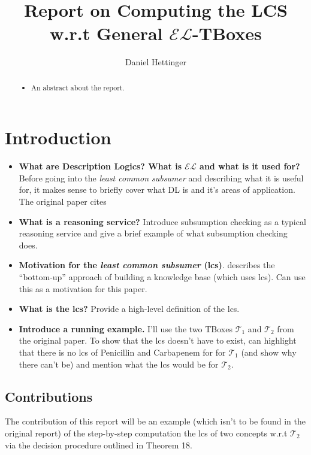 \documentclass[a4paper,USenglish,cleveref,autoref,thm-restate]{lipics-v2021}
\title{Report on Computing the LCS w.r.t General \(\mathcal{E}\mathcal{L}\)-TBoxes}
\author{Daniel Hettinger}{Paderborn University, Germany}{dhetti2@campus.uni-paderborn.de}{}{}
\newcommand{\EL}{{\(\mathcal{EL}\)}}
\begin{document}
\maketitle

\begin{abstract}
    \begin{itemize}
        \item An abstract about the report. 
    \end{itemize}
\end{abstract}

\section{Introduction}
\label{sec:introduction}

\begin{itemize}
    \item \textbf{What are Description Logics? What is \EL{} and what is it used for?} 
    Before going into the \textit{least common subsumer} and describing what it is useful 
    for, it makes sense to briefly cover what DL is and it's areas of application. The 
    original paper cites %
    \item \textbf{What is a reasoning service?} Introduce subsumption checking as a typical 
    reasoning service and give a brief example of what subsumption checking does. 
    \item \textbf{Motivation for the \textit{least common subsumer} (lcs)}. 
    \cite{DBLP:conf/ijcai/BaaderKM99} describes the ``bottom-up'' approach of building a 
    knowledge base (which uses lcs). Can use this as a motivation for this paper. 
    \item \textbf{What is the lcs?} Provide a high-level definition of the lcs. 
    \item \textbf{Introduce a running example.} I'll use the two TBoxes \(\mathcal{T}_1\) and 
    \(\mathcal{T}_2\) from the original paper. To show that the lcs doesn't have to exist, 
    can highlight that there is no lcs of Penicillin and Carbapenem for for \(\mathcal{T}_1\) 
    (and show why there can't be) and mention what the lcs would be for \(\mathcal{T}_2\).
\end{itemize}

\subsection{Contributions}
    The contribution of this report will be an example (which isn't to be found in the 
    original report) of the step-by-step computation the lcs of two concepts w.r.t 
    \(\mathcal{T}_2\) via the decision procedure outlined in Theorem 18.
\end{document}
